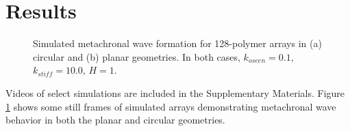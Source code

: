 \documentclass[11pt]{ucthesis}
\begin{document}
\section{Results}
\label{sec:results}

\begin{figure}
\centering
{}
\qquad
{}
\caption{Simulated metachronal wave formation for 128-polymer arrays in (a) circular and (b) planar geometries. 
In both cases, $k_{oseen} = 0.1$, $k_{stiff}  = 10.0$, $H=1$.
\label{fig:anims}}
\end{figure}
Videos of select simulations are included in the Supplementary
Materials. Figure \ref{fig:anims} shows some still frames of simulated
arrays demonstrating metachronal wave behavior in both the planar
and circular geometries.

\end{document}
